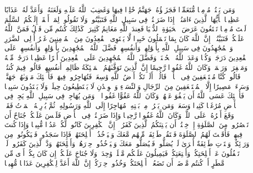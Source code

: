 \stopbuffer
\startbuffer[\q:4:93]
وَمَن یَقۡتُلۡ مُؤۡمِنࣰا مُّتَعَمِّدࣰا فَجَزَاۤؤُهُۥ جَهَنَّمُ خَٰلِدࣰا فِیهَا وَغَضِبَ ٱللَّهُ عَلَیۡهِ وَلَعَنَهُۥ وَأَعَدَّ لَهُۥ عَذَابًا عَظِیمࣰا%
\stopbuffer
\startbuffer[\q:4:94]
یَٰۤأَیُّهَا ٱلَّذِینَ ءَامَنُوۤا۟ إِذَا ضَرَبۡتُمۡ فِی سَبِیلِ ٱللَّهِ فَتَبَیَّنُوا۟ وَلَا تَقُولُوا۟ لِمَنۡ أَلۡقَىٰۤ إِلَیۡكُمُ ٱلسَّلَٰمَ لَسۡتَ مُؤۡمِنࣰا تَبۡتَغُونَ عَرَضَ ٱلۡحَیَوٰةِ ٱلدُّنۡیَا فَعِندَ ٱللَّهِ مَغَانِمُ كَثِیرَةࣱۚ كَذَٰلِكَ كُنتُم مِّن قَبۡلُ فَمَنَّ ٱللَّهُ عَلَیۡكُمۡ فَتَبَیَّنُوۤا۟ۚ إِنَّ ٱللَّهَ كَانَ بِمَا تَعۡمَلُونَ خَبِیرࣰا%
\stopbuffer
\startbuffer[\q:4:95]
لَّا یَسۡتَوِی ٱلۡقَٰعِدُونَ مِنَ ٱلۡمُؤۡمِنِینَ غَیۡرُ أُو۟لِی ٱلضَّرَرِ وَٱلۡمُجَٰهِدُونَ فِی سَبِیلِ ٱللَّهِ بِأَمۡوَٰلِهِمۡ وَأَنفُسِهِمۡۚ فَضَّلَ ٱللَّهُ ٱلۡمُجَٰهِدِینَ بِأَمۡوَٰلِهِمۡ وَأَنفُسِهِمۡ عَلَى ٱلۡقَٰعِدِینَ دَرَجَةࣰۚ وَكُلࣰّا وَعَدَ ٱللَّهُ ٱلۡحُسۡنَىٰۚ وَفَضَّلَ ٱللَّهُ ٱلۡمُجَٰهِدِینَ عَلَى ٱلۡقَٰعِدِینَ أَجۡرًا عَظِیمࣰا%
\stopbuffer
\startbuffer[\q:4:96]
دَرَجَٰتࣲ مِّنۡهُ وَمَغۡفِرَةࣰ وَرَحۡمَةࣰۚ وَكَانَ ٱللَّهُ غَفُورࣰا رَّحِیمًا%
\stopbuffer
\startbuffer[\q:4:97]
إِنَّ ٱلَّذِینَ تَوَفَّىٰهُمُ ٱلۡمَلَٰۤئِكَةُ ظَالِمِیۤ أَنفُسِهِمۡ قَالُوا۟ فِیمَ كُنتُمۡۖ قَالُوا۟ كُنَّا مُسۡتَضۡعَفِینَ فِی ٱلۡأَرۡضِۚ قَالُوۤا۟ أَلَمۡ تَكُنۡ أَرۡضُ ٱللَّهِ وَٰسِعَةࣰ فَتُهَاجِرُوا۟ فِیهَاۚ فَأُو۟لَٰۤئِكَ مَأۡوَىٰهُمۡ جَهَنَّمُۖ وَسَاۤءَتۡ مَصِیرًا%
\stopbuffer
\startbuffer[\q:4:98]
إِلَّا ٱلۡمُسۡتَضۡعَفِینَ مِنَ ٱلرِّجَالِ وَٱلنِّسَاۤءِ وَٱلۡوِلۡدَٰنِ لَا یَسۡتَطِیعُونَ حِیلَةࣰ وَلَا یَهۡتَدُونَ سَبِیلࣰا%
\stopbuffer
\startbuffer[\q:4:99]
فَأُو۟لَٰۤئِكَ عَسَى ٱللَّهُ أَن یَعۡفُوَ عَنۡهُمۡۚ وَكَانَ ٱللَّهُ عَفُوًّا غَفُورࣰا%
\stopbuffer
\startbuffer[\q:4:100]
۞ وَمَن یُهَاجِرۡ فِی سَبِیلِ ٱللَّهِ یَجِدۡ فِی ٱلۡأَرۡضِ مُرَٰغَمࣰا كَثِیرࣰا وَسَعَةࣰۚ وَمَن یَخۡرُجۡ مِنۢ بَیۡتِهِۦ مُهَاجِرًا إِلَى ٱللَّهِ وَرَسُولِهِۦ ثُمَّ یُدۡرِكۡهُ ٱلۡمَوۡتُ فَقَدۡ وَقَعَ أَجۡرُهُۥ عَلَى ٱللَّهِۗ وَكَانَ ٱللَّهُ غَفُورࣰا رَّحِیمࣰا%
\stopbuffer
\startbuffer[\q:4:101]
وَإِذَا ضَرَبۡتُمۡ فِی ٱلۡأَرۡضِ فَلَیۡسَ عَلَیۡكُمۡ جُنَاحٌ أَن تَقۡصُرُوا۟ مِنَ ٱلصَّلَوٰةِ إِنۡ خِفۡتُمۡ أَن یَفۡتِنَكُمُ ٱلَّذِینَ كَفَرُوۤا۟ۚ إِنَّ ٱلۡكَٰفِرِینَ كَانُوا۟ لَكُمۡ عَدُوࣰّا مُّبِینࣰا%
\stopbuffer
\startbuffer[\q:4:102]
وَإِذَا كُنتَ فِیهِمۡ فَأَقَمۡتَ لَهُمُ ٱلصَّلَوٰةَ فَلۡتَقُمۡ طَاۤئِفَةࣱ مِّنۡهُم مَّعَكَ وَلۡیَأۡخُذُوۤا۟ أَسۡلِحَتَهُمۡۖ فَإِذَا سَجَدُوا۟ فَلۡیَكُونُوا۟ مِن وَرَاۤئِكُمۡ وَلۡتَأۡتِ طَاۤئِفَةٌ أُخۡرَىٰ لَمۡ یُصَلُّوا۟ فَلۡیُصَلُّوا۟ مَعَكَ وَلۡیَأۡخُذُوا۟ حِذۡرَهُمۡ وَأَسۡلِحَتَهُمۡۗ وَدَّ ٱلَّذِینَ كَفَرُوا۟ لَوۡ تَغۡفُلُونَ عَنۡ أَسۡلِحَتِكُمۡ وَأَمۡتِعَتِكُمۡ فَیَمِیلُونَ عَلَیۡكُم مَّیۡلَةࣰ وَٰحِدَةࣰۚ وَلَا جُنَاحَ عَلَیۡكُمۡ إِن كَانَ بِكُمۡ أَذࣰى مِّن مَّطَرٍ أَوۡ كُنتُم مَّرۡضَىٰۤ أَن تَضَعُوۤا۟ أَسۡلِحَتَكُمۡۖ وَخُذُوا۟ حِذۡرَكُمۡۗ إِنَّ ٱللَّهَ أَعَدَّ لِلۡكَٰفِرِینَ عَذَابࣰا مُّهِینࣰا%

